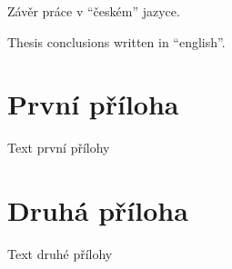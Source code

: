 \documentclass[a4paper,12pt]{article}
\begin{document}
\begin{upconclusions}[czech]
Závěr práce v \enquote{českém} jazyce.
\end{upconclusions}

\begin{upconclusions}[english]
Thesis conclusions written in \enquote{english}.
\end{upconclusions}

\upprintabbrevlist

\upprintbibliography

\upappendix
\section{První příloha}
Text první přílohy

\section{Druhá příloha}
Text druhé přílohy

\upprintindex
\end{document}
